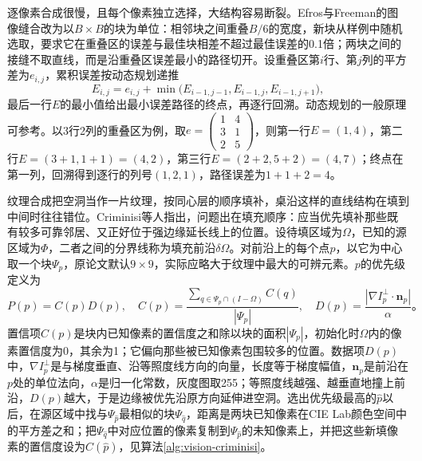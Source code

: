 逐像素合成很慢，且每个像素独立选择，大结构容易断裂。Efros与Freeman的图像缝合改为以$B\times B$的块为单位：相邻块之间重叠$B/6$的宽度，新块从样例中随机选取，要求它在重叠区的误差与最佳块相差不超过最佳误差的0.1倍；两块之间的接缝不取直线，而是沿重叠区误差最小的路径切开。设重叠区第$i$行、第$j$列的平方差为$e_{i,j}$，累积误差按动态规划递推
\begin{equation*}
 E_{i,j}=e_{i,j}+\min\bigl(E_{i-1,j-1},E_{i-1,j},E_{i-1,j+1}\bigr),
\end{equation*}
最后一行$E$的最小值给出最小误差路径的终点，再逐行回溯。动态规划的一般原理可参考。以3行2列的重叠区为例，取$e=\left(\begin{smallmatrix}1&4\\3&1\\2&5\end{smallmatrix}\right)$，则第一行$E=(1,4)$，第二行$E=(3+1,1+1)=(4,2)$，第三行$E=(2+2,5+2)=(4,7)$；终点在第一列，回溯得到逐行的列号$(1,2,1)$，路径误差为$1+1+2=4$。

纹理合成把空洞当作一片纹理，按同心层的顺序填补，桌沿这样的直线结构在填到中间时往往错位。Criminisi等人指出，问题出在填充顺序：应当优先填补那些既有较多可靠邻居、又正好位于强边缘延长线上的位置。设待填区域为$\Omega$，已知的源区域为$\Phi$，二者之间的分界线称为填充前沿$\delta\Omega$。对前沿上的每个点$p$，以它为中心取一个块$\Psi_p$，原论文默认$9\times9$，实际应略大于纹理中最大的可辨元素。$p$的优先级定义为
\begin{equation}
 P(p)=C(p)D(p),\quad
 C(p)=\frac{\sum_{q\in\Psi_p\cap(I-\Omega)}C(q)}{|\Psi_p|},\quad
 D(p)=\frac{|\nabla I_p^{\perp}\cdot\bm{n}_p|}{\alpha}\text{。}
 \label{eq:vision-criminisi-priority}
\end{equation}
置信项$C(p)$是块内已知像素的置信度之和除以块的面积$|\Psi_p|$，初始化时$\Omega$内的像素置信度为0，其余为1；它偏向那些被已知像素包围较多的位置。数据项$D(p)$中，$\nabla I_p^{\perp}$是与梯度垂直、沿等照度线方向的向量，长度等于梯度幅值，$\bm{n}_p$是前沿在$p$处的单位法向，$\alpha$是归一化常数，灰度图取255；等照度线越强、越垂直地撞上前沿，$D(p)$越大，于是边缘被优先沿原方向延伸进空洞。选出优先级最高的$\hat p$以后，在源区域中找与$\Psi_{\hat p}$最相似的块$\Psi_{\hat q}$，距离是两块已知像素在CIE Lab颜色空间中的平方差之和；把$\Psi_{\hat q}$中对应位置的像素复制到$\Psi_{\hat p}$的未知像素上，并把这些新填像素的置信度设为$C(\hat p)$，见算法\ref{alg:vision-criminisi}。

